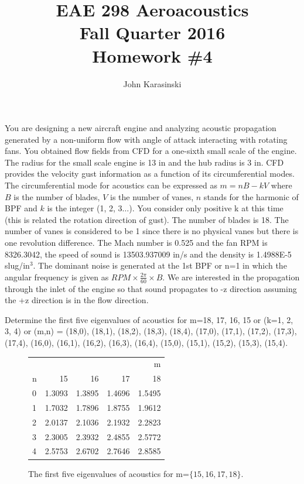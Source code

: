 \documentclass[onecolumn,10pt]{jhwhw}
\author{John Karasinski}
\title{EAE 298 Aeroacoustics \\ Fall Quarter 2016 \\ Homework \#4}
\begin{document}
\maketitle

You are designing a new aircraft engine and analyzing acoustic propagation generated by a non-uniform flow with angle of attack interacting with rotating fans. You obtained flow fields from CFD for a one-sixth small scale of the engine. The radius for the small scale engine is 13 in and the hub radius is 3 in. CFD provides the velocity gust information as a function of its circumferential modes. The circumferential mode for acoustics can be expressed as $m= nB - kV$ where $B$ is the number of blades, $V$ is the number of vanes, $n$ stands for the harmonic of BPF and $k$ is the integer (1, 2, 3$\ldots$). You consider only positive k at this time (this is related the rotation direction of gust). The number of blades is 18. The number of vanes is considered to be 1 since there is no physical vanes but there is one revolution difference. The Mach number is 0.525 and the fan RPM is 8326.3042, the speed of sound is 13503.937009 in/s and the density is 1.4988E-5 slug/in$^3$. The dominant noise is generated at the 1st BPF or n=1 in which the angular frequency is given as $RPM \times \frac{2 \pi}{60} \times B$. We are interested in the propagation through the inlet of the engine so that sound propagates to -z direction assuming the +z direction is in the flow direction.

\problem{[20 points]}
Determine the first five eigenvalues of acoustics for m=18, 17, 16, 15 or (k=1, 2, 3, 4) or (m,n) = (18,0), (18,1), (18,2), (18,3), (18,4), (17,0), (17,1), (17,2), (17,3), (17,4), (16,0), (16,1), (16,2), (16,3), (16,4), (15,0), (15,1), (15,2), (15,3), (15,4).

\begin{figure}[h]
\centering
\begin{tabular}{l | rrrr}
\toprule
  &         &         &         &       m \\
n &      15 &      16 &      17 &      18 \\
\midrule
0 &  1.3093 &  1.3895 &  1.4696 &  1.5495 \\
1 &  1.7032 &  1.7896 &  1.8755 &  1.9612 \\
2 &  2.0137 &  2.1036 &  2.1932 &  2.2823 \\
3 &  2.3005 &  2.3932 &  2.4855 &  2.5772 \\
4 &  2.5753 &  2.6702 &  2.7646 &  2.8585 \\
\bottomrule
\end{tabular}
\caption{The first five eigenvalues of acoustics for m=$\{15, 16, 17, 18\}.$}
\end{figure}
\end{document}
